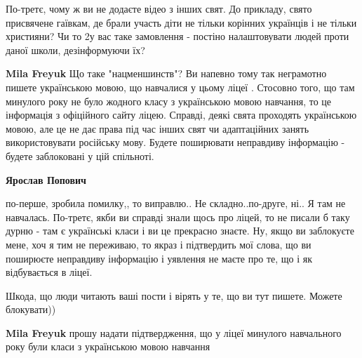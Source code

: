 \begin{itemize}
\begin{itemize}
По-третє, чому ж ви не додаєте відео з інших свят. До прикладу, свято
присвячене гаївкам, де брали участь діти не тільки корінних українців і не
тільки християни? Чи то 2у вас таке замовлення - постіно налаштовувати людей
проти даної школи, дезінформуючи їх?

\begin{itemize}
 
\textbf{Mila Freyuk} Що таке "нацменшинств"? Ви напевно тому так неграмотно
пишете українською мовою, що навчалися у цьому ліцеї \Smiley[1.0][yellow]. Стосовно того, що там
минулого року не було жодного класу з українською мовою навчання, то це
інформація з офіційного сайту ліцею. Справді, деякі свята проходять українською
мовою, але це не дає права під час інших свят чи адаптаційних занять
використовувати російську мову. Будете поширювати неправдиву інформацію -
будете заблоковані у цій спільноті.

\begin{itemize}
 
\textbf{Ярослав Попович} 

по-перше, зробила помилку,, то виправлю.. Не складно..по-друге, ні.. Я там не
навчалась. По-третє, якби ви справді знали щось про ліцей, то не писали б таку
дурню - там є українські класи і ви це прекрасно знаєте. Ну, якщо ви заблокуєте
мене, хоч я тим не переживаю, то якраз і підтвердить мої слова, що ви поширюєте
неправдиву інформацію і уявлення не маєте про те, що і як відбувається в ліцеї.

Шкода, що люди читають ваші пости і вірять у те, що ви тут пишете. Можете блокувати))


 
\textbf{Mila Freyuk} прошу надати підтвердження, що у ліцеї минулого навчального року були класи з українською мовою навчання
\end{itemize}


\end{itemize}
\end{itemize}
\end{itemize}
